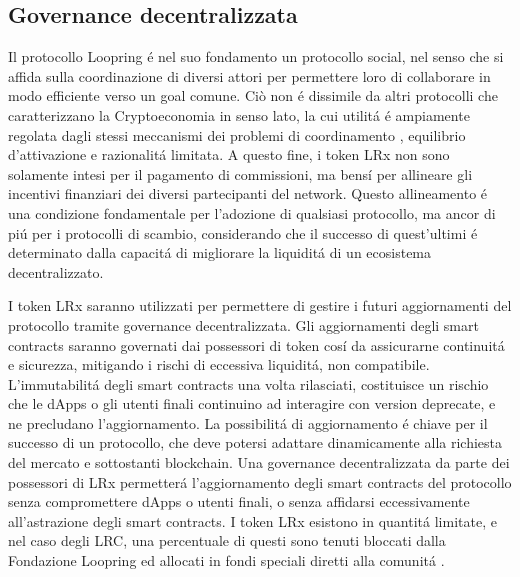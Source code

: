 \documentclass[UTF8,nofonts]{article}
\begin{document}
\begin{multicols}{2}
\subsection{Governance decentralizzata}
Il protocollo Loopring \'e nel suo fondamento un protocollo social, nel senso che si affida sulla coordinazione di diversi attori per permettere loro di collaborare in modo efficiente verso un goal comune. Ciò non \'e dissimile da altri protocolli che caratterizzano la Cryptoeconomia in senso lato, la cui utilit\'a \'e ampiamente regolata dagli stessi meccanismi dei problemi di coordinamento \cite{vitalikgovernance}, equilibrio d'attivazione e razionalit\'a limitata. A questo fine, i token LRx non sono solamente intesi per il pagamento di commissioni, ma bens\'i per allineare gli incentivi finanziari dei diversi partecipanti del network. Questo allineamento \'e una condizione fondamentale per l'adozione di qualsiasi protocollo, ma ancor di pi\'u per i protocolli di scambio, considerando che il successo di quest'ultimi \'e determinato dalla capacit\'a di migliorare la liquidit\'a di un ecosistema decentralizzato.

I token LRx saranno utilizzati per permettere di gestire i futuri aggiornamenti del protocollo tramite governance decentralizzata. Gli aggiornamenti degli smart contracts saranno governati dai possessori di token cos\'i da assicurarne continuit\'a e sicurezza, mitigando i rischi di eccessiva liquidit\'a, non compatibile. L'immutabilit\'a degli smart contracts una volta rilasciati, costituisce un rischio che le dApps o gli utenti finali continuino ad interagire con version deprecate, e ne precludano l'aggiornamento.
La possibilit\'a di aggiornamento \'e chiave per il successo di un protocollo, che deve potersi adattare dinamicamente alla richiesta del mercato e sottostanti blockchain. Una governance decentralizzata da parte dei possessori di LRx permetter\'a l'aggiornamento degli smart contracts del protocollo senza compromettere dApps o utenti finali, o senza affidarsi eccessivamente all'astrazione degli smart contracts. I token LRx esistono in quantit\'a limitate, e nel caso degli LRC, una percentuale di questi sono tenuti bloccati dalla Fondazione Loopring ed allocati in fondi speciali diretti alla comunit\'a \cite{LRCtokendoc}.


\end{multicols}
\end{document}
